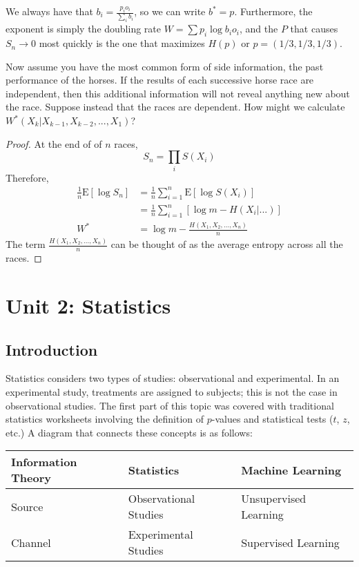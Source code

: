 \documentclass[11pt]{article}
\theoremstyle{definition}
\begin{document}
We always have that $b_i = \frac{p_i o_i}{\sum_i b_i}$, so we can write $b^* = p$. Furthermore, the exponent is simply the doubling rate $W = \sum p_i \log b_i o_i$, and the $P$ that causes $S_n \rightarrow 0$ most quickly is the one that maximizes $H(p)$ or $p = (1/3, 1/3, 1/3)$. 

\example Now assume you have the most common form of side information, the past performance of the horses. If the results of each successive horse race are independent, then this additional information will not reveal anything new about the race. Suppose instead that the races are dependent. How might we calculate $W^*(X_k | X_{k-1}, X_{k-2},..., X_1)$?

\begin{proof}
At the end of of $n$ races, $$S_n = \prod_i S(X_i)$$
Therefore,
\begin{align*}
\frac{1}{n} \mathrm{E}\left[\log{S_n}\right] &= \frac{1}{n} \sum_{i=1}^{n} \mathrm{E}\left[\log{S(X_i)}\right]\\
							        &= \frac{1}{n} \sum_{i=1}^{n} \left[\log{m} - H(X_i | ...)\right]\\
							  W^*&=  \log{m} - \frac{H(X_1, X_2,...,X_n)}{n}
\end{align*}
The term $\frac{H(X_1, X_2,...,X_n)}{n}$ can be thought of as the average entropy across all the races. 
\end{proof}

\section{Unit 2: Statistics}

\subsection{Introduction}
Statistics considers two types of studies: observational and experimental. In an experimental study, treatments are assigned to subjects; this is not the case in observational studies. The first part of this topic was covered with traditional statistics worksheets involving the definition of $p$-values and statistical tests ($t$, $z$, etc.) A diagram that connects these concepts is as follows:

\begin{table}[ht]
\centering
\begin{tabular}{@{}lll@{}}
\toprule
Information Theory & Statistics            & Machine Learning      \\ \midrule
Source             & Observational Studies & Unsupervised Learning \\
Channel            & Experimental Studies  & Supervised Learning   \\ \bottomrule
\end{tabular}
\end{table}
\end{document}
